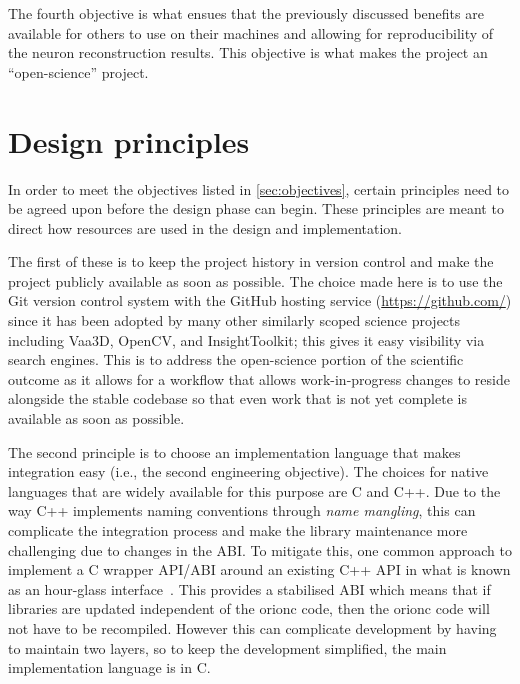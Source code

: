 The fourth objective is what ensues that the previously discussed
benefits are available for others to use on their machines and
allowing for reproducibility of the neuron reconstruction results.
This objective is what makes the project an ``open-science''
project.

\section{Design principles}

In order to meet the objectives listed in \cref{sec:objectives},
certain principles need to be agreed upon before the design phase
can begin. These principles are meant to direct how resources are
used in the design and implementation.

The first of these is to keep the project history in version
control and make the project publicly available as soon as
possible. The choice made here is to use the Git version control
system with the GitHub hosting service (\url{https://github.com/})
since it has been adopted by many other similarly scoped
science projects including Vaa3D, OpenCV, and InsightToolkit; this
gives it easy visibility via search engines. This is to address
the open-science portion of the scientific outcome as it
allows for a workflow that allows work-in-progress changes to
reside alongside the stable codebase so that even work that is not
yet complete is available as soon as possible.

The second principle is to choose an implementation language that
makes integration easy (i.e., the second engineering objective).
The choices for native languages that are widely available for
this purpose are C and C++. Due to the way C++ implements
naming conventions through \emph{name mangling}, this can
complicate the integration process and make the library
maintenance more challenging due to changes in the \acrshort{ABI}.
To mitigate this, one common approach to implement a C wrapper
\acrshort{API}/\acrshort{ABI} around an existing C++ \acrshort{API}
in what is known as an hour-glass interface~\autocite{CppCon:Hourglass:2014}.
This provides a stabilised \acrshort{ABI} which means that if
libraries are updated independent of the \gls{orionc} code, then
the \gls{orionc} code will not have to be recompiled. However this can
complicate development by having to maintain two layers, so to
keep the development simplified, the main implementation language
is in C.

